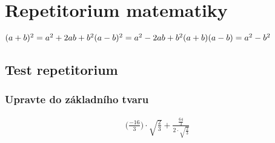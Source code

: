 

 \section*{Repetitorium matematiky}
\(
(a+b)^2 = a^2 +2ab + b^2 \\
(a-b)^2 = a^2 -2ab + b^2 \\
(a+b)(a-b) = a^2 - b^2
\)
\subsection*{Test repetitorium}
\subsubsection{Upravte do základního tvaru}
\begin{gather*}
    \bigl(
        \frac{-16}{3}
    \bigr) \cdot \sqrt{\frac{2}{3}} + \frac{\frac{64}{3}}{2\cdot\sqrt{\frac{2}{3}}}
\end{gather*}
